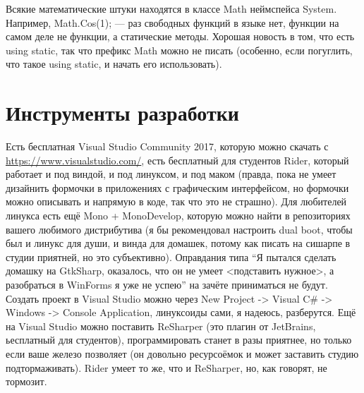 \documentclass[a5paper]{article}
\begin{document}
Всякие математические штуки находятся в классе Math неймспейса System. Например, Math.Cos(1); --- раз свободных функций в языке нет, функции на самом деле не функции, а статические методы. Хорошая новость в том, что есть using static, так что префикс Math можно не писать (особенно, если погуглить, что такое using static, и начать его использовать).

\section{Инструменты разработки}

Есть бесплатная Visual Studio Community 2017, которую можно скачать с \url{https://www.visualstudio.com/}, есть бесплатный для студентов Rider, который работает и под виндой, и под линуксом, и под маком (правда, пока не умеет дизайнить формочки в приложениях с графическим интерфейсом, но формочки можно описывать и напрямую в коде, так что это не страшно). Для любителей линукса есть ещё Mono + MonoDevelop, которую можно найти в репозиториях вашего любимого дистрибутива (я бы рекомендовал настроить dual boot, чтобы был и линукс для души, и винда для домашек, потому как писать на сишарпе в студии приятней, но это субъективно). Оправдания типа ``Я пытался сделать домашку на GtkSharp, оказалось, что он не умеет <подставить нужное>, а разобраться в WinForms я уже не успею'' на зачёте приниматься не будут. Создать проект в Visual Studio можно через New Project -> Visual C\# -> Windows -> Console Application, линуксоиды сами, я надеюсь, разберутся. Ещё на Visual Studio можно поставить ReSharper (это плагин от JetBrains, ьесплатный для студентов), программировать станет в разы приятнее, но только если ваше железо позволяет (он довольно ресурсоёмок и может заставить студию подтормаживать). Rider умеет то же, что и ReSharper, но, как говорят, не тормозит.
\end{document}
